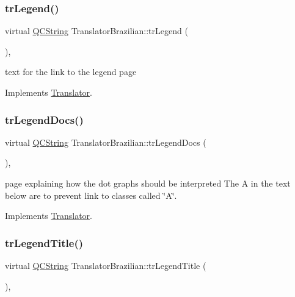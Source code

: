 \subsubsection{\texorpdfstring{trLegend()}{trLegend()}}
{\footnotesize\ttfamily virtual \mbox{\hyperlink{class_q_c_string}{Q\+C\+String}} Translator\+Brazilian\+::tr\+Legend (\begin{DoxyParamCaption}{ }\end{DoxyParamCaption})\hspace{0.3cm}{\ttfamily [inline]}, {\ttfamily [virtual]}}

text for the link to the legend page 

Implements \mbox{\hyperlink{class_translator}{Translator}}.

\mbox{\label{class_translator_brazilian_a7d8c37b055c8ff044e4a5726572755c4}} 
\subsubsection{\texorpdfstring{trLegendDocs()}{trLegendDocs()}}
{\footnotesize\ttfamily virtual \mbox{\hyperlink{class_q_c_string}{Q\+C\+String}} Translator\+Brazilian\+::tr\+Legend\+Docs (\begin{DoxyParamCaption}{ }\end{DoxyParamCaption})\hspace{0.3cm}{\ttfamily [inline]}, {\ttfamily [virtual]}}

page explaining how the dot graph\textquotesingle{}s should be interpreted The A in the text below are to prevent link to classes called \char`\"{}\+A\char`\"{}. 

Implements \mbox{\hyperlink{class_translator}{Translator}}.

\mbox{\label{class_translator_brazilian_abd8de5d15c5d191f2c1728ef56e724be}} 
\subsubsection{\texorpdfstring{trLegendTitle()}{trLegendTitle()}}
{\footnotesize\ttfamily virtual \mbox{\hyperlink{class_q_c_string}{Q\+C\+String}} Translator\+Brazilian\+::tr\+Legend\+Title (\begin{DoxyParamCaption}{ }\end{DoxyParamCaption})\hspace{0.3cm}{\ttfamily [inline]}, {\ttfamily [virtual]}}

